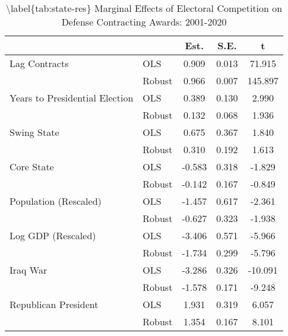 \begin{table}

\caption{\textbackslash{}label\{tab:state-res\} Marginal Effects of Electoral Competition on Defense Contracting Awards: 2001-2020}
\centering
\begin{tabular}[t]{llccc}
\toprule
  &    & Est. & S.E. & t\\
\midrule
Lag Contracts & OLS & 0.909 & 0.013 & 71.915\\
 & Robust & 0.966 & 0.007 & 145.897\\
Years to Presidential
Election & OLS & 0.389 & 0.130 & 2.990\\
 & Robust & 0.132 & 0.068 & 1.936\\
Swing State & OLS & 0.675 & 0.367 & 1.840\\
 & Robust & 0.310 & 0.192 & 1.613\\
Core State & OLS & -0.583 & 0.318 & -1.829\\
 & Robust & -0.142 & 0.167 & -0.849\\
Population (Rescaled) & OLS & -1.457 & 0.617 & -2.361\\
 & Robust & -0.627 & 0.323 & -1.938\\
Log GDP (Rescaled) & OLS & -3.406 & 0.571 & -5.966\\
 & Robust & -1.734 & 0.299 & -5.796\\
Iraq War & OLS & -3.286 & 0.326 & -10.091\\
 & Robust & -1.578 & 0.171 & -9.248\\
Republican President & OLS & 1.931 & 0.319 & 6.057\\
 & Robust & 1.354 & 0.167 & 8.101\\
\bottomrule
\end{tabular}
\end{table}
